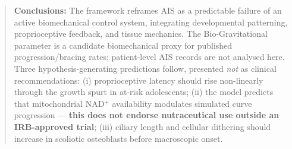 \begin{abstract}
\noindent\textbf{Conclusions:} The framework reframes AIS as a predictable failure of an active biomechanical control system, integrating developmental patterning, proprioceptive feedback, and tissue mechanics. The Bio-Gravitational parameter is a candidate biomechanical proxy for published progression/bracing rates; patient-level AIS records are not analysed here. Three hypothesis-generating predictions follow, presented \emph{not} as clinical recommendations: (i) proprioceptive latency should rise non-linearly through the growth spurt in at-risk adolescents; (ii) the model predicts that mitochondrial NAD$^+$ availability modulates simulated curve progression --- \textbf{this does not endorse nutraceutical use outside an IRB-approved trial}; (iii) ciliary length and cellular dithering should increase in scoliotic osteoblasts before macroscopic onset.
\end{abstract}

